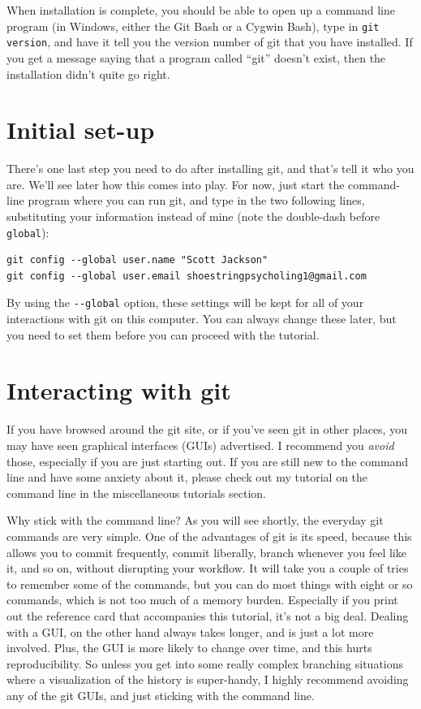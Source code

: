 \documentclass[11pt]{article}
\begin{document}
When installation is complete, you should be able to open up a command line program (in Windows, either the Git Bash or a Cygwin Bash), type in \texttt{git version}, and have it tell you the version number of git that you have installed. If you get a message saying that a program called ``git'' doesn't exist, then the installation didn't quite go right.
\section{Initial set-up}
\label{sec-3}

There's one last step you need to do after installing git, and that's tell it who you are.  We'll see later how this comes into play. For now, just start the command-line program where you can run git, and type in the two following lines, substituting your information instead of mine (note the double-dash before \texttt{global}):


\begin{verbatim}
git config --global user.name "Scott Jackson"
git config --global user.email shoestringpsycholing1@gmail.com
\end{verbatim}

By using the \texttt{-{}-global} option, these settings will be kept for all of your interactions with git on this computer. You can always change these later, but you need to set them before you can proceed with the tutorial.
\section{Interacting with git}
\label{sec-4}

If you have browsed around the git site, or if you've seen git in other places, you may have seen graphical interfaces (GUIs) advertised.  I recommend you \emph{avoid} those, especially if you are just starting out. If you are still new to the command line and have some anxiety about it, please check out my tutorial on the command line in the miscellaneous tutorials section.

Why stick with the command line? As you will see shortly, the everyday git commands are very simple. One of the advantages of git is its speed, because this allows you to commit frequently, commit liberally, branch whenever you feel like it, and so on, without disrupting your workflow. It will take you a couple of tries to remember some of the commands, but you can do most things with eight or so commands, which is not too much of a memory burden.  Especially if you print out the reference card that accompanies this tutorial, it's not a big deal.  Dealing with a GUI, on the other hand always takes longer, and is just a lot more involved. Plus, the GUI is more likely to change over time, and this hurts reproducibility. So unless you get into some really complex branching situations where a visualization of the history is super-handy, I highly recommend avoiding any of the git GUIs, and just sticking with the command line.
\end{document}
